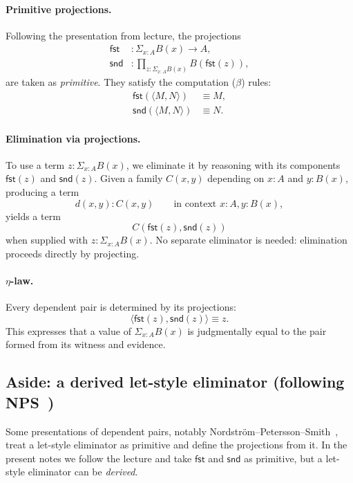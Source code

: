 \documentclass[11pt]{article}
\newcommand{\fst}{\mathsf{fst}}
\newcommand{\snd}{\mathsf{snd}}
\newcommand{\pair}[2]{\langle #1,#2\rangle}
\theoremstyle{definition}
\theoremstyle{plain}
\theoremstyle{remark}
\begin{document}
\paragraph{Primitive projections.}
Following the presentation from lecture, the projections
\begin{align*}
\fst &: \Sigma_{x:A} B(x) \to A,\\
\snd &: \prod_{z : \Sigma_{x:A} B(x)} B(\fst(z)),
\end{align*}
are taken as \emph{primitive}.  
They satisfy the computation (\(\beta\)) rules:
\begin{align*}
\fst(\pair{M}{N}) &\equiv M,\\
\snd(\pair{M}{N}) &\equiv N.
\end{align*}

\paragraph{Elimination via projections.}
To use a term $z : \Sigma_{x:A} B(x)$, we eliminate it by reasoning with its 
components $\fst(z)$ and $\snd(z)$.  
Given a family $C(x,y)$ depending on $x{:}A$ and $y{:}B(x)$, producing a term
\[
d(x,y) : C(x,y)
\qquad \text{in context } x{:}A, y{:}B(x),
\]
yields a term
\[
C(\fst(z), \snd(z))
\]
when supplied with $z : \Sigma_{x:A} B(x)$.  
No separate eliminator is needed: elimination proceeds directly by projecting.

\paragraph{$\eta$-law.}
Every dependent pair is determined by its projections:
\begin{equation*}
\pair{\fst(z)}{\snd(z)} \equiv z.
\end{equation*}
This expresses that a value of $\Sigma_{x:A} B(x)$ is judgmentally equal to the pair formed
from its witness and evidence.

\subsection{Aside: a derived let-style eliminator (following NPS~\cite{nps1990})}

Some presentations of dependent pairs, notably Nordström–Petersson–Smith~\cite{nps1990},
treat a let-style eliminator as primitive and define the projections from it.  
In the present notes we follow the lecture and take $\fst$ and $\snd$ as primitive, but a
let-style eliminator can be \emph{derived}.
\end{document}
